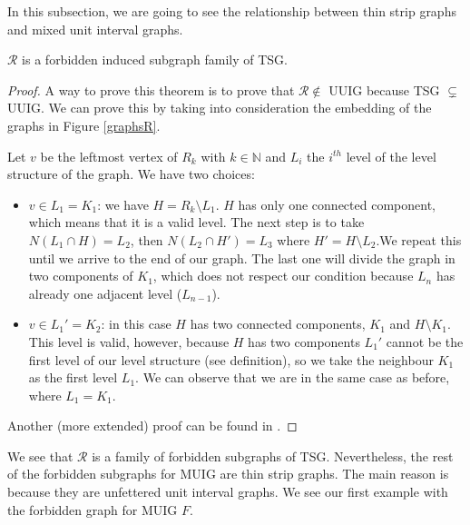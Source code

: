 In this subsection, we are going to see the relationship between thin strip graphs and mixed unit interval graphs.

\begin{theorem}
  $\mathcal{R}$ is a forbidden induced subgraph family of TSG.
\end{theorem}

\begin{proof}
  A way to prove this theorem is to prove that $\mathcal{R} \notin$ UUIG because TSG $\subsetneq$ UUIG. We can prove this by taking into consideration the embedding of the graphs in Figure \ref{graphsR}.

  Let $v$ be the leftmost vertex of $R_k$ with $k \in \mathbb{N}$ and $L_i$ the $i^{th}$ level of the level structure of the graph. We have two choices:

  \begin{itemize}
    \item $v\in L_1 = K_1$: we have $H = R_k\setminus L_1$.
    $H$ has only one connected component, which means that it is a valid level. The next step is to take $N(L_1 \cap H) = L_2$, then $N(L_2 \cap H') = L_3$ where $H' = H\setminus L_2$.We repeat this until we arrive to the end of our graph. The last one will divide the graph in two components of $K_1$, which does not respect our condition because $L_n$ has already one adjacent level ($L_{n-1}$).
    \item $v\in L_1' = K_2$: in this case $H$ has two connected components, $K_1$ and $H\setminus K_1$. This level is valid, however, because $H$ has two components $L_1'$ cannot be the first level of our level structure (see definition), so we take the neighbour $K_1$ as the first level $L_1$. We can observe that we are in the same case as before, where $L_1 = K_1$.
  \end{itemize}

  Another (more extended) proof can be found in \cite{hayashiThinStripGraphs2017}.
\end{proof}

We see that $\mathcal{R}$ is a family of forbidden subgraphs of TSG. Nevertheless, the rest of the forbidden subgraphs for MUIG are thin strip graphs. The main reason is because they are unfettered unit interval graphs. We see our first example with the forbidden graph for MUIG $F$.


